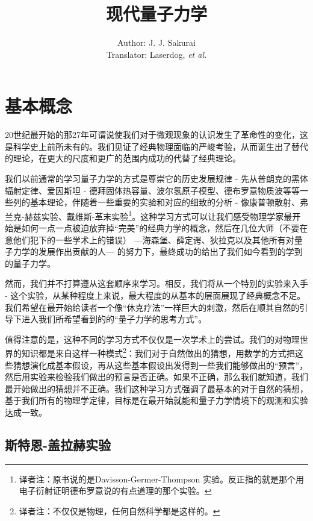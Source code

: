 \documentclass[UTF8,twoside]{ctexart}
\begin{document}
\title{现代量子力学}
\author{Author: J. J. Sakurai\\
Translator: Laserdog, \it et al. }
\date{}

\maketitle
\thispagestyle{empty}

\cleardoublepage
{}
\tableofcontents
\clearpage
\setcounter{page}{1}
\section{基本概念}\label{Ch1}
\noindent 20世纪最开始的那27年可谓说使我们对于微观现象的认识发生了革命性的变化，这是科学史上前所未有的。我们见证了经典物理面临的严峻考验，从而诞生出了替代的理论，在更大的尺度和更广的范围内成功的代替了经典理论。

我们以前通常的学习量子力学的方式是尊崇它的历史发展规律 - 先从普朗克的黑体辐射定律、爱因斯坦 - 德拜固体热容量、波尔氢原子模型、德布罗意物质波等等一些列的基本理论，伴随着一些重要的实验和对应的细致的分析 - 像康普顿散射、弗兰克-赫兹实验、戴维斯-革末实验\footnote{译者注：原书说的是Davisson-Germer-Thompson 实验。反正指的就是那个用电子衍射证明德布罗意说的有点道理的那个实验。}。这种学习方式可以让我们感受物理学家最开始是如何一点一点被迫放弃掉“完美”的经典力学的概念，然后在几位大师（不要在意他们犯下的一些学术上的错误） —海森堡、薛定谔、狄拉克以及其他所有对量子力学的发展作出贡献的人— 的努力下，最终成功的给出了我们如今看到的学到的量子力学。

然而，我们并不打算遵从这套顺序来学习。相反，我们将从一个特别的实验来入手 - 这个实验，从某种程度上来说，最大程度的从基本的层面展现了经典概念不足。我们希望在最开始给读者一个像“休克疗法”一样巨大的刺激，然后在顺其自然的引导下进入我们所希望看到的的“量子力学的思考方式”。

值得注意的是，这种不同的学习方式不仅仅是一次学术上的尝试。我们的对物理世界的知识都是来自这样一种模式\footnote{译者注：不仅仅是物理，任何自然科学都是这样的。}：我们对于自然做出的猜想，用数学的方式把这些猜想演化成基本假设，再从这些基本假设出发得到一些我们能够做出的“预言”，然后用实验来检验我们做出的预言是否正确。如果不正确，那么我们就知道，我们最开始做出的猜想并不正确。我们这种学习方式强调了最基本的对于自然的猜想，基于我们所有的物理学定律，目标是在最开始就能和量子力学情境下的观测和实验达成一致。
\clearpage
\subsection{斯特恩-盖拉赫实验}\label{s1.1}
\end{document}
